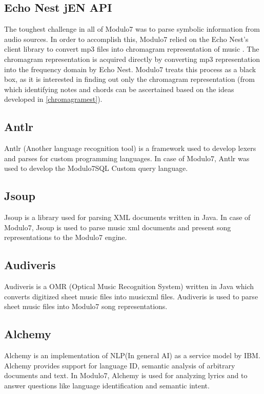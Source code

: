 \subsection{Echo Nest jEN API} \label{echonestjen}

\noindent The toughest challenge in all of Modulo7 was to parse symbolic information from audio sources. In order to accomplish this, Modulo7 relied on the Echo Nest's client library to convert mp3 files into chromagram representation of music \cite{chromagramtutorial}. The chromagram representation is acquired directly by converting mp3 representation into the frequency domain by Echo Nest. Modulo7 treats this process as a black box, as it is interested in finding out only the chromagram representation (from which identifying notes and chords can be ascertained based on the ideas developed in \ref{chromagramest}). 

\subsection{Antlr} \label{antlr}

\noindent Antlr (Another language recognition tool) is a framework used to develop lexers and parses for custom programming languages. In case of Modulo7, Antlr was used to develop the Modulo7SQL Custom query language.

\subsection{Jsoup}

\noindent Jsoup is a library used for parsing XML documents written in Java. In case of Modulo7, Jsoup is used to parse music xml documents and present song representations to the Modulo7 engine. 

\subsection{Audiveris}

\noindent Audiveris is a OMR (Optical Music Recognition System) written in Java which converts digitized sheet music files into musicxml files. Audiveris is used to parse sheet music files into Modulo7 song representations.

\subsection{Alchemy} \label{Alchemy}

\noindent Alchemy is an implementation of NLP(In general AI) as a service model by IBM. Alchemy provides support for language ID, semantic analysis of arbitrary documents and text. In Modulo7, Alchemy is used for analyzing lyrics and to answer questions like language identification and semantic intent. 


